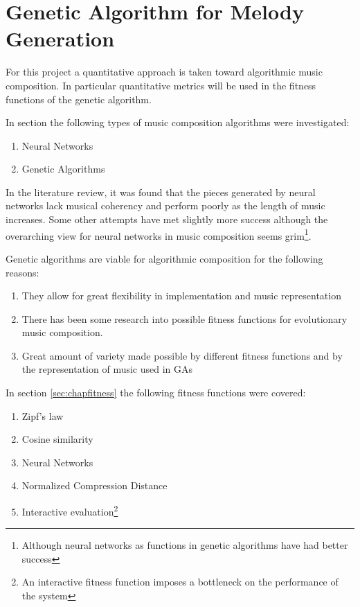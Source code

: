 


\chapter{Genetic Algorithm for Melody Generation}

For this project a quantitative approach is taken toward algorithmic music composition. In particular quantitative metrics will be used in the fitness functions of the genetic algorithm.

In section \label{chap:comp_algo} the following types of music composition algorithms were investigated:
\begin{enumerate}
\item Neural Networks
\item Genetic Algorithms
\end{enumerate}
In the literature review, it was found that the pieces generated by neural networks lack musical coherency and perform poorly as the length of music increases. Some other attempts have met slightly more success although the overarching view for neural networks in music composition seems grim\footnote{Although neural networks as functions in genetic algorithms have had better success}.

Genetic algorithms are viable for algorithmic composition for the following reasons:
\begin{enumerate}
\item They allow for great flexibility in implementation and music representation
\item There has been some research into possible fitness functions for evolutionary music composition.
\item Great amount of variety made possible by different fitness functions and by the representation of music used in \acp{GA}
\end{enumerate}

In section \ref{sec:chapfitness} the following fitness functions were covered:
\begin{enumerate}
\item Zipf's law
\item Cosine similarity
\item Neural Networks
\item Normalized Compression Distance
\item Interactive evaluation\footnote{An interactive fitness function imposes a bottleneck on the performance of the system}
\end{enumerate}

